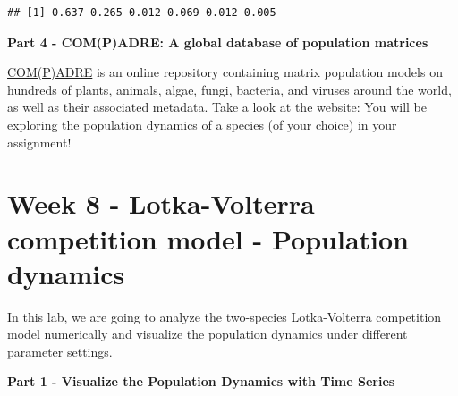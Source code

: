 \documentclass[
]{book}
\begin{document}
\begin{verbatim}
## [1] 0.637 0.265 0.012 0.069 0.012 0.005
\end{verbatim}

\textbf{Part 4 - COM(P)ADRE: A global database of population matrices}

\href{https://compadre-db.org/ExploreDatabase}{COM(P)ADRE} is an online repository containing matrix population models on hundreds of plants, animals, algae, fungi, bacteria, and viruses around the world, as well as their associated metadata. Take a look at the website: You will be exploring the population dynamics of a species (of your choice) in your assignment!

\hypertarget{week-8---lotka-volterra-competition-model---population-dynamics}{%
\chapter*{Week 8 - Lotka-Volterra competition model - Population dynamics}\label{week-8---lotka-volterra-competition-model---population-dynamics}}

In this lab, we are going to analyze the two-species Lotka-Volterra competition model numerically and visualize the population dynamics under different parameter settings.

\textbf{Part 1 - Visualize the Population Dynamics with Time Series}
\end{document}

